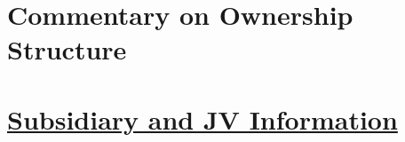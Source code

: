 \documentclass{article}
\begin{document}
\section*{Commentary on Ownership Structure}


\section*{\underline{Subsidiary and JV Information}}
\end{document}
